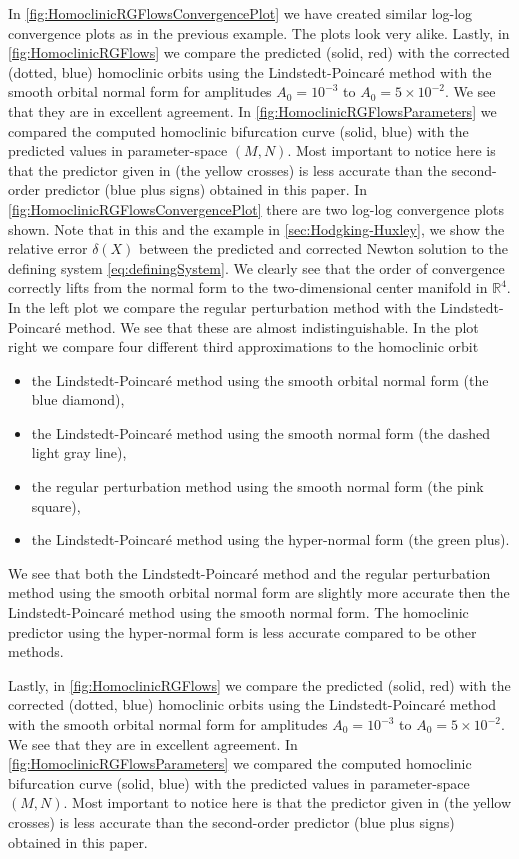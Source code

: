 \ifthesis 
In \cref{fig:HomoclinicRGFlowsConvergencePlot} we have created similar log-log
convergence plots as in the previous example. The plots look very alike.
%
Lastly, in \cref{fig:HomoclinicRGFlows}  we compare the predicted (solid, red)
with the corrected (dotted, blue) homoclinic orbits using the
Lindstedt-Poincar\'e method with the smooth orbital normal form for amplitudes
$A_0 = 10^{-3}$ to $A_0=5\times 10^{-2}$. We see that they are in excellent
agreement. In \cref{fig:HomoclinicRGFlowsParameters} we compared the
    computed homoclinic bifurcation curve (solid, blue) with the predicted
    values in parameter-space $(M, N)$. Most important to notice here is that
    the predictor given in \cite{Al-Hdaibat2016} (the yellow crosses) is less
accurate than the second-order predictor (blue plus signs) obtained in this
paper. 
\else
In \cref{fig:HomoclinicRGFlowsConvergencePlot} there are two log-log
convergence plots shown. Note that in this and the example in
\cref{sec:Hodgking-Huxley}, we show the relative error $\delta(X)$ between the
predicted and corrected Newton solution to the defining system
\cref{eq:definingSystem}.  We clearly see that the order of convergence
correctly lifts from the normal form to the two-dimensional center manifold in
$\mathbb R^4$. In the left plot we compare the regular perturbation method
with the Lindstedt-Poincar\'e method. We see that these are almost
indistinguishable. In the plot right we compare four different third
approximations to the homoclinic orbit
\begin{itemize}
    \item the Lindstedt-Poincar\'e method using the smooth orbital normal form
        (the blue diamond),
    \item the Lindstedt-Poincar\'e method using the smooth normal form
        (the dashed light gray line),
    \item the regular perturbation method using the smooth normal form
        (the pink square), 
    \item the Lindstedt-Poincar\'e method using the hyper-normal form
        (the green plus).
\end{itemize}

We see that both the Lindstedt-Poincar\'e method and the regular perturbation
method using the smooth orbital normal form are slightly more accurate then the
Lindstedt-Poincar\'e method using the smooth normal form. The homoclinic
predictor using the hyper-normal form is less accurate compared to be
other methods.

Lastly, in \cref{fig:HomoclinicRGFlows}  we compare the predicted (solid, red)
with the corrected (dotted, blue) homoclinic orbits using the
Lindstedt-Poincar\'e method with the smooth orbital normal form for amplitudes
$A_0 = 10^{-3}$ to $A_0=5\times 10^{-2}$. We see that they are in excellent
agreement. In \cref{fig:HomoclinicRGFlowsParameters} we compared the
    computed homoclinic bifurcation curve (solid, blue) with the predicted
    values in parameter-space $(M, N)$. Most important to notice here is that
    the predictor given in \cite{Al-Hdaibat2016} (the yellow crosses) is less
accurate than the second-order predictor (blue plus signs) obtained in this
paper. 
\fi
